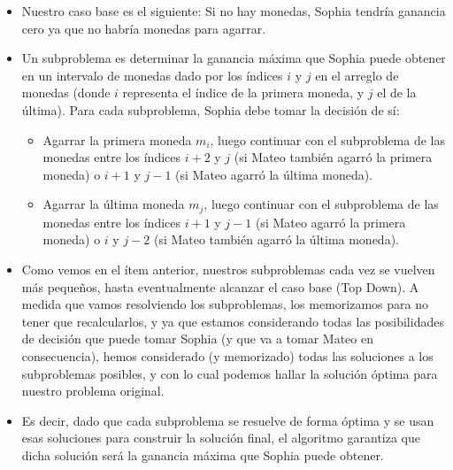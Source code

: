 \begin{itemize}
    \item Nuestro caso base es el siguiente: Si no hay monedas, Sophia tendría ganancia cero ya que no habría monedas para agarrar.
    \item Un subproblema es determinar la ganancia máxima que Sophia puede obtener en un intervalo de monedas dado por los índices \(i\) y \(j\) en el arreglo de monedas (donde \(i\) representa el índice de la primera moneda, y \(j\) el de la última). Para cada subproblema, Sophia debe tomar la decisión de sí:
    \begin{itemize}
        \item Agarrar la primera moneda \(m_i\), luego continuar con el subproblema de las monedas entre los índices \(i+2\) y \(j\) (si Mateo también agarró la primera moneda) o \(i+1\) y \(j-1\) (si Mateo agarró la última moneda).
        \item Agarrar la última moneda \(m_j\), luego continuar con el subproblema de las monedas entre los índices \(i+1\) y \(j-1\) (si Mateo agarró la primera moneda) o \(i\) y \(j-2\) (si Mateo también agarró la última moneda).
    \end{itemize}
    \item Como vemos en el ítem anterior, nuestros subproblemas cada vez se vuelven más pequeños, hasta eventualmente alcanzar el caso base (Top Down). A medida que vamos resolviendo los subproblemas, los memorizamos para no tener que recalcularlos, y ya que estamos considerando todas las posibilidades de decisión que puede tomar Sophia (y que va a tomar Mateo en consecuencia), hemos considerado (y memorizado) todas las soluciones a los subproblemas posibles, y con lo cual podemos hallar la solución óptima para nuestro problema original.
    \item Es decir, dado que cada subproblema se resuelve de forma óptima y se usan esas soluciones para construir la solución final, el algoritmo garantiza que dicha solución será la ganancia máxima que Sophia puede obtener.
\end{itemize}